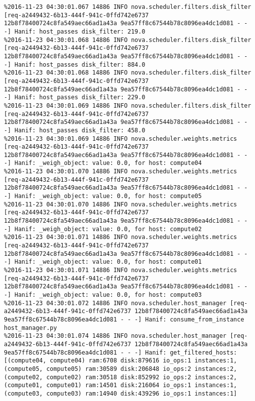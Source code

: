 \begin{lstlisting}[frame=single, caption={The filter scheduler log trace for 10 virtual instances}, label={lst:filterschedulercodetracelog10vi}, escapechar=|]
%2016-11-23 04:30:01.067 14886 INFO nova.scheduler.filters.disk_filter [req-a2449432-6b13-444f-941c-0ffd742e6737 12b8f78400724c8fa549aec66ad1a43a 9ea57ff8c67544b78c8096ea4dc1d081 - - -] Hanif: host_passes disk_filter: 911.0
%2016-11-23 04:30:01.067 14886 INFO nova.scheduler.filters.disk_filter [req-a2449432-6b13-444f-941c-0ffd742e6737 12b8f78400724c8fa549aec66ad1a43a 9ea57ff8c67544b78c8096ea4dc1d081 - - -] Hanif: host_passes disk_filter: 219.0
%2016-11-23 04:30:01.068 14886 INFO nova.scheduler.filters.disk_filter [req-a2449432-6b13-444f-941c-0ffd742e6737 12b8f78400724c8fa549aec66ad1a43a 9ea57ff8c67544b78c8096ea4dc1d081 - - -] Hanif: host_passes disk_filter: 884.0
%2016-11-23 04:30:01.068 14886 INFO nova.scheduler.filters.disk_filter [req-a2449432-6b13-444f-941c-0ffd742e6737 12b8f78400724c8fa549aec66ad1a43a 9ea57ff8c67544b78c8096ea4dc1d081 - - -] Hanif: host_passes disk_filter: 229.0
%2016-11-23 04:30:01.069 14886 INFO nova.scheduler.filters.disk_filter [req-a2449432-6b13-444f-941c-0ffd742e6737 12b8f78400724c8fa549aec66ad1a43a 9ea57ff8c67544b78c8096ea4dc1d081 - - -] Hanif: host_passes disk_filter: 458.0
%2016-11-23 04:30:01.069 14886 INFO nova.scheduler.weights.metrics [req-a2449432-6b13-444f-941c-0ffd742e6737 12b8f78400724c8fa549aec66ad1a43a 9ea57ff8c67544b78c8096ea4dc1d081 - - -] Hanif: _weigh_object: value: 0.0, for host: compute04
%2016-11-23 04:30:01.070 14886 INFO nova.scheduler.weights.metrics [req-a2449432-6b13-444f-941c-0ffd742e6737 12b8f78400724c8fa549aec66ad1a43a 9ea57ff8c67544b78c8096ea4dc1d081 - - -] Hanif: _weigh_object: value: 0.0, for host: compute05
%2016-11-23 04:30:01.070 14886 INFO nova.scheduler.weights.metrics [req-a2449432-6b13-444f-941c-0ffd742e6737 12b8f78400724c8fa549aec66ad1a43a 9ea57ff8c67544b78c8096ea4dc1d081 - - -] Hanif: _weigh_object: value: 0.0, for host: compute02
%2016-11-23 04:30:01.071 14886 INFO nova.scheduler.weights.metrics [req-a2449432-6b13-444f-941c-0ffd742e6737 12b8f78400724c8fa549aec66ad1a43a 9ea57ff8c67544b78c8096ea4dc1d081 - - -] Hanif: _weigh_object: value: 0.0, for host: compute01
%2016-11-23 04:30:01.071 14886 INFO nova.scheduler.weights.metrics [req-a2449432-6b13-444f-941c-0ffd742e6737 12b8f78400724c8fa549aec66ad1a43a 9ea57ff8c67544b78c8096ea4dc1d081 - - -] Hanif: _weigh_object: value: 0.0, for host: compute03
%2016-11-23 04:30:01.072 14886 INFO nova.scheduler.host_manager [req-a2449432-6b13-444f-941c-0ffd742e6737 12b8f78400724c8fa549aec66ad1a43a 9ea57ff8c67544b78c8096ea4dc1d081 - - -] Hanif: consume_from_instance host_manager.py
%2016-11-23 04:30:01.074 14886 INFO nova.scheduler.host_manager [req-a2449432-6b13-444f-941c-0ffd742e6737 12b8f78400724c8fa549aec66ad1a43a 9ea57ff8c67544b78c8096ea4dc1d081 - - -] Hanif: get_filtered_hosts: [(compute04, compute04) ram:6708 disk:879616 io_ops:1 instances:1, (compute05, compute05) ram:30589 disk:206848 io_ops:2 instances:2, (compute02, compute02) ram:30518 disk:852992 io_ops:2 instances:2, (compute01, compute01) ram:14501 disk:216064 io_ops:1 instances:1, (compute03, compute03) ram:14940 disk:439296 io_ops:1 instances:1]

\end{lstlisting}

